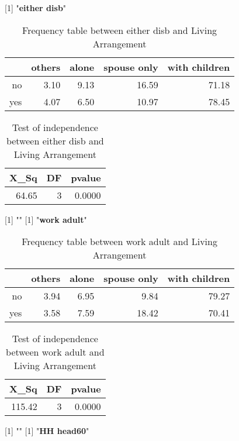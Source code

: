 \documentclass[11pt]{article}
\begin{document}
[1] "{\bf{either disb}}"
\begin{table}[H]
\centering
\begin{tabular}{rrrrr}
  \hline
 & others & alone & spouse only & with children \\ 
  \hline
no & 3.10 & 9.13 & 16.59 & 71.18 \\ 
  yes & 4.07 & 6.50 & 10.97 & 78.45 \\ 
   \hline
\end{tabular}
\caption{Frequency table between either disb and Living Arrangement} 
\end{table}
\begin{table}[H]
\centering
\begin{tabular}{rrr}
  \hline
X\_Sq & DF & pvalue \\ 
  \hline
64.65 & 3 & 0.0000 \\ 
   \hline
\end{tabular}
\caption{Test of independence between either disb and Living Arrangement} 
\end{table}
[1] "\newline"
[1] "{\bf{work adult}}"
\begin{table}[H]
\centering
\begin{tabular}{rrrrr}
  \hline
 & others & alone & spouse only & with children \\ 
  \hline
no & 3.94 & 6.95 & 9.84 & 79.27 \\ 
  yes & 3.58 & 7.59 & 18.42 & 70.41 \\ 
   \hline
\end{tabular}
\caption{Frequency table between work adult and Living Arrangement} 
\end{table}
\begin{table}[H]
\centering
\begin{tabular}{rrr}
  \hline
X\_Sq & DF & pvalue \\ 
  \hline
115.42 & 3 & 0.0000 \\ 
   \hline
\end{tabular}
\caption{Test of independence between work adult and Living Arrangement} 
\end{table}
[1] "\newline"
[1] "{\bf{HH head60}}"
\end{document}
